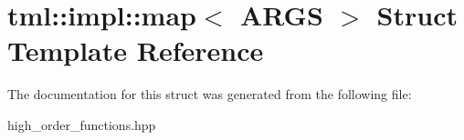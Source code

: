 \hypertarget{structtml_1_1impl_1_1map}{\section{tml\+:\+:impl\+:\+:map$<$ A\+R\+G\+S $>$ Struct Template Reference}
\label{structtml_1_1impl_1_1map}
}


The documentation for this struct was generated from the following file\+:\begin{DoxyCompactItemize}
\item 
high\+\_\+order\+\_\+functions.\+hpp\end{DoxyCompactItemize}
